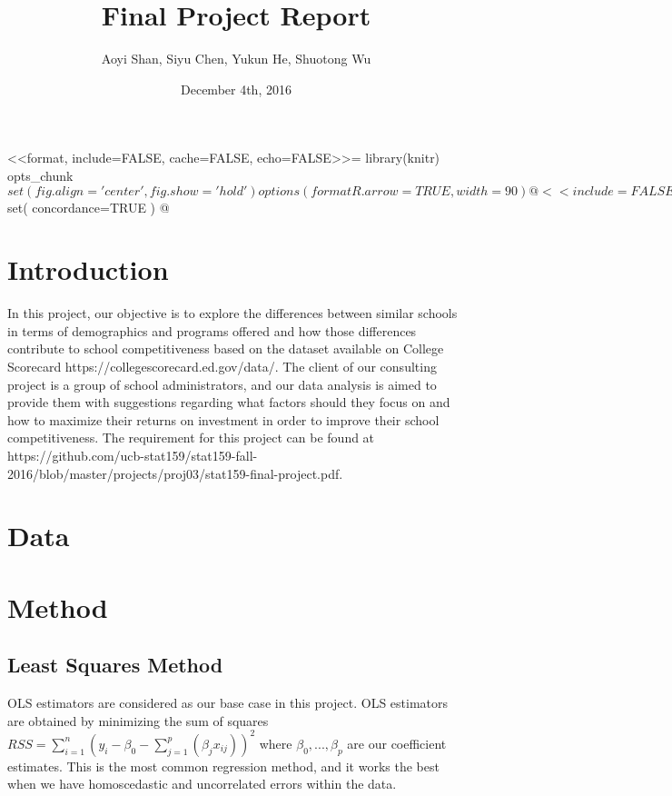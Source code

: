 \documentclass{article}
\title{Final Project Report}
\author{Aoyi Shan, Siyu Chen, Yukun He, Shuotong Wu}
\date{December 4th, 2016}
\begin{document}
<<format, include=FALSE, cache=FALSE, echo=FALSE>>=
library(knitr)
opts_chunk$set(fig.align='center', fig.show='hold')
options(formatR.arrow=TRUE,width=90)
@

<<include=FALSE>>=
library(knitr)
opts_chunk$set(
concordance=TRUE
)
@


\maketitle

\section{Introduction}

In this project, our objective is to explore the differences between similar schools in terms of demographics and programs offered and how those differences contribute to school competitiveness based on the dataset available on College Scorecard https://collegescorecard.ed.gov/data/. The client of our consulting project is a group of school administrators, and our data analysis is aimed to provide them with suggestions regarding what factors should they focus on and how to maximize their returns on investment in order to improve their school competitiveness. The requirement for this project can be found at https://github.com/ucb-stat159/stat159-fall-2016/blob/master/projects/proj03/stat159-final-project.pdf.

\section{Data}

\section{Method}

\subsection{Least Squares Method}

OLS estimators are considered as our base case in this project. OLS estimators are obtained by minimizing the sum of squares $RSS = \sum_{i=1}^n(y_i - \beta_0 - \sum_{j=1}^p(\beta_{j}x_{ij}))^2$ where $\beta_0, ..., \beta_p$ are our coefficient estimates. This is the most common regression method, and it works the best when we have homoscedastic and uncorrelated errors within the data.
\end{document}
